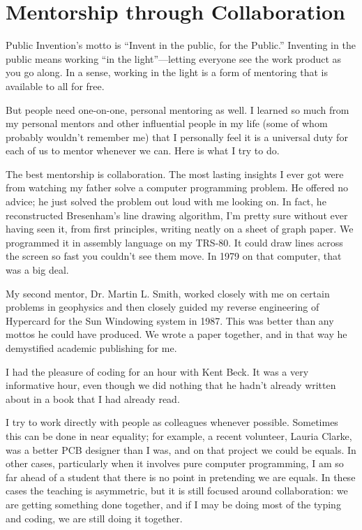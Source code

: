 \documentclass[
	fontsize=10pt, %
	twoside=false, %
	secnumdepth=1, %
]{kaobook}
\begin{document}
\section{Mentorship through Collaboration}

Public Invention’s motto is “Invent in the public, for the
Public.”  Inventing in the
public means working “in the light”---letting everyone see the work
product as you go along.  In a sense, working in the light is a form
of mentoring that is available to all for free.

But people need one-on-one, personal mentoring as well. I learned so
much from my personal mentors and other influential people in my life
(some of whom probably wouldn’t remember me) that I personally feel it
is a universal duty for each of us to mentor whenever we can. Here is
what I try to do.

The best mentorship is collaboration. The most lasting insights I ever
got were from watching my father solve a computer programming
problem. He offered no advice; he just solved the problem out loud
with me looking on. In fact, he reconstructed Bresenham’s line drawing
algorithm, I’m pretty sure without ever having seen it, from first
principles, writing neatly on a sheet of graph paper. We programmed it
in assembly language on my TRS-80. It could draw lines across the
screen so fast you couldn’t see them move. In 1979 on that computer,
that was a big deal.

My second mentor, Dr. Martin L. Smith, worked closely with me on
certain problems in geophysics and then closely guided my reverse
engineering of Hypercard for the Sun Windowing system in 1987. This
was better than any mottos he could have produced. We wrote a paper
together, and in that way he demystified academic publishing for me.

I had the pleasure of coding for an hour with Kent Beck. It was a very
informative hour, even though we did nothing that he hadn’t already
written about in a book that I had already read.

I try to work directly with people as colleagues whenever
possible. Sometimes this can be done in near equality; for example, a
recent volunteer, Lauria Clarke, was a better PCB designer than I was,
and on that project we could be equals. In other cases, particularly
when it involves pure computer programming, I am so far ahead of a
student that there is no point in pretending we are equals. In these
cases the teaching is asymmetric, but it is still focused around
collaboration: we are getting something done together, and if I may be
doing most of the typing and coding, we are still doing it together.
\end{document}
